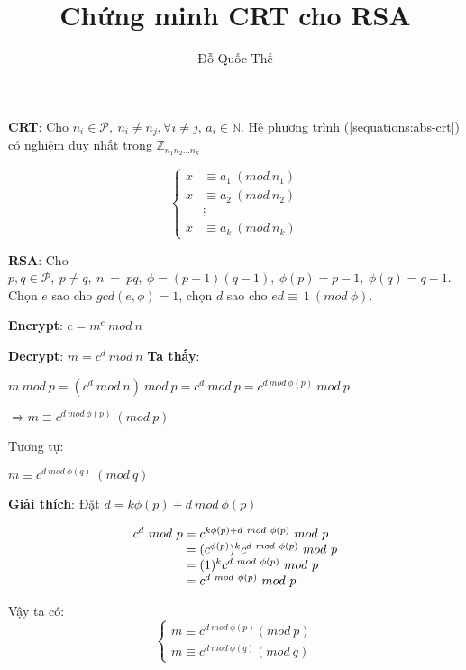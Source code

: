 \documentclass[12pt]{article}
\author{Đỗ Quốc Thế}
\title{Chứng minh CRT cho RSA}
\begin{document}
\maketitle

\textbf{CRT}: Cho $n_i \in \mathcal{P},\ n_i \neq n_j, \forall i \neq j$, $a_i \in \mathbb{N}$. Hệ phương trình (\ref{sequations:abs-crt}) có nghiệm duy nhất trong $\mathbb{Z}_{n_1n_2\hdots n_k}$

\begin{equation}\label{sequations:abs-crt}
\begin{cases}
x &\equiv a_1\ (mod\ n_1) \\
x &\equiv a_2\ (mod\ n_2) \\
& \vdots \\
x &\equiv a_k\ (mod\ n_k)
\end{cases}
\end{equation}


\textbf{RSA}: Cho $p,q \in \mathcal{P},\ p \neq q,\ n\ =\ pq,\ \phi=(p-1)(q-1),\ \phi(p)=p-1,\ \phi(q)=q-1$. Chọn $e$ sao cho $gcd(e,\phi)=1$, chọn $d$ sao cho $ed\equiv\ 1\ (mod\ \phi)$.

\textbf{Encrypt}: $c=m^e\ mod\ n$

\textbf{Decrypt}: $m=c^d\ mod\ n$
\vskip 0.2in
\textbf{Ta thấy}: 

$m\ mod\ p=(c^d\ mod\ n)\ mod\ p =c^d\ mod\ p = c^{d\ mod\ \phi(p)}\ mod\ p$

$\Rightarrow m \equiv c^{d\ mod\ \phi(p)}\ (mod\ p)$


Tương tự: 

$m \equiv c^{d\ mod\ \phi(q)}\ (mod\ q)$

\vskip 0.2in
\textbf{Giải thích}: Đặt $d = k\phi(p) + d\ mod\ \phi(p)$

\begin{equation*}
\begin{array}{l@{}l}
c^d\ mod\ p &{}= c^{k\phi(p) + d\ mod\ \phi(p)}\ mod\ p\\
&{}=(c^{\phi(p)})^kc^{d\ mod\ \phi(p)}\ mod\ p \\
&{}=(1)^kc^{d\ mod\ \phi(p)}\ mod\ p \\
&{}= c^{d\ mod\ \phi(p)}\ mod\ p
\end{array}
\end{equation*}

Vậy ta có: 
\begin{equation}\label{sequations:rsa-crt}
\begin{cases}
m \equiv c^{d\ mod\ \phi(p)} (mod\ p) \\
m \equiv c^{d\ mod\ \phi(q)} (mod\ q)
\end{cases}
\end{equation}
\end{document}
